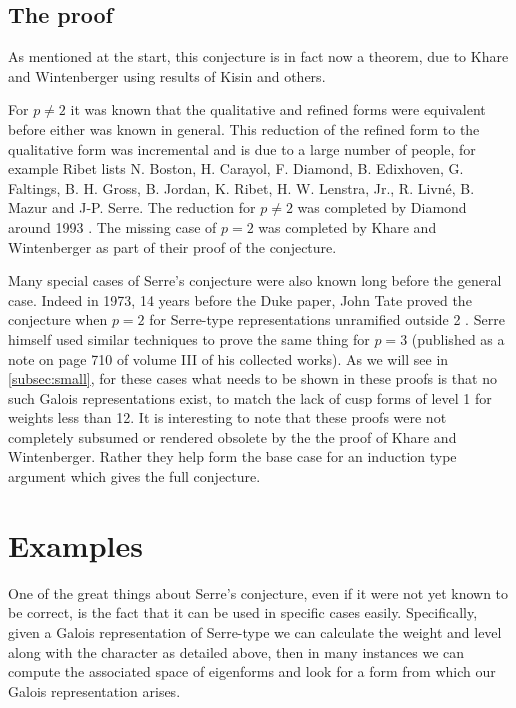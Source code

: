 \documentclass[a4paper,12pt]{article}
\begin{document}
\subsection{The proof}
As mentioned at the start, this conjecture is in fact now a theorem, due to Khare and Wintenberger using results of Kisin and others.

For $p \ne 2$ it was known that the qualitative and refined forms were equivalent before either was known in general.
This reduction of the refined form to the qualitative form was incremental and is due to a large number of people, for example Ribet \cite{Ribet94} lists N. Boston, H. Carayol, F. Diamond, B. Edixhoven, G. Faltings, B. H. Gross, B. Jordan, K. Ribet, H. W. Lenstra, Jr., R. Livn\'e, B. Mazur and J-P. Serre.
The reduction for $p\ne 2$ was completed by Diamond around 1993 \cite{Diamond}.
The missing case of $p=2$ was completed by Khare and Wintenberger as part of their proof of the conjecture.

Many special cases of Serre's conjecture were also known long before the general case.
Indeed in 1973, 14 years before the Duke paper, John Tate proved the conjecture when $p = 2$ for Serre-type representations unramified outside 2 \cite{Tate}.
Serre himself used similar techniques to prove the same thing for $p = 3$ (published as a note on page 710 of volume III of his collected works).
As we will see in \cref{subsec:small}, for these cases what needs to be shown in these proofs is that no such Galois representations exist, to match the lack of cusp forms of level 1 for weights less than 12.
It is interesting to note that these proofs were not completely subsumed or rendered obsolete by the the proof of Khare and Wintenberger.
Rather they help form the base case for an induction type argument which gives the full conjecture.



\section{Examples}
One of the great things about Serre's conjecture, even if it were not yet known to be correct, is the fact that it can be used in specific cases easily.
Specifically, given a Galois representation of Serre-type we can calculate the weight and level along with the character as detailed above, then in many instances we can compute the associated space of eigenforms and look for a form from which our Galois representation arises.
\end{document}
